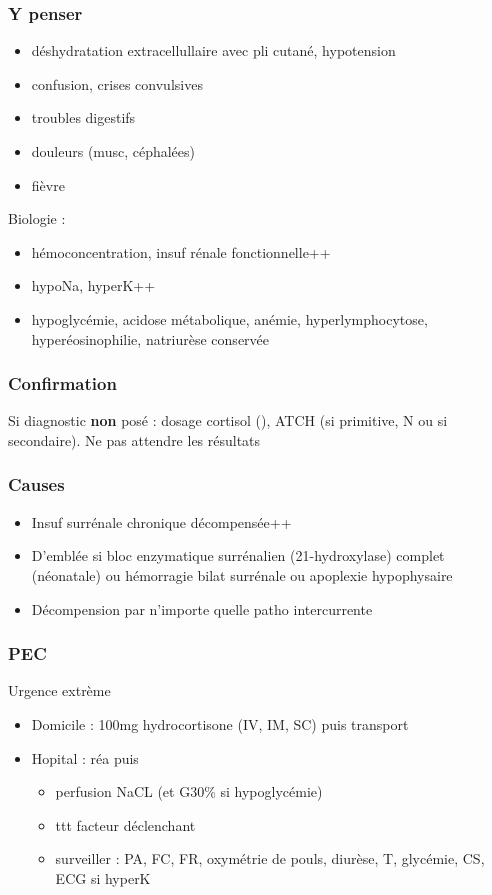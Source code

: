 \documentclass[11pt]{article}
\begin{document}
\subsubsection{Y penser}
\label{sec:orgf537c5f}
\begin{itemize}
\item déshydratation extracellullaire avec pli cutané, hypotension
\item confusion, crises convulsives
\item troubles digestifs
\item douleurs (musc, céphalées)
\item fièvre
\end{itemize}
Biologie : 
\begin{itemize}
\item hémoconcentration, insuf rénale fonctionnelle++
\item hypoNa, hyperK++
\item hypoglycémie, acidose métabolique, anémie, hyperlymphocytose,
hyperéosinophilie, natriurèse conservée
\end{itemize}

\subsubsection{Confirmation}
\label{sec:org062a958}
Si diagnostic \textbf{non} posé : dosage cortisol (\dec\dec), ATCH (\inc si primitive, N ou \dec
si secondaire). 
Ne pas attendre les résultats \skull

\subsubsection{Causes}
\label{sec:org2cf61ac}
\begin{itemize}
\item Insuf surrénale chronique décompensée++
\item D'emblée si bloc enzymatique surrénalien (21-hydroxylase) complet (néonatale)
ou hémorragie bilat surrénale ou apoplexie hypophysaire
\item Décompension par n'importe quelle patho intercurrente
\end{itemize}

\subsubsection{PEC}
\label{sec:org9a0d01b}
\danger Urgence extrème \skull
\begin{itemize}
\item Domicile : 100mg hydrocortisone (IV, IM, SC) puis transport
\item Hopital : réa puis 
\begin{itemize}
\item perfusion NaCL (et G30\% si hypoglycémie)
\item ttt facteur déclenchant
\item surveiller : PA, FC, FR, oxymétrie de pouls, diurèse, T, glycémie, CS, ECG
si hyperK
\end{itemize}
\end{itemize}
\end{document}
